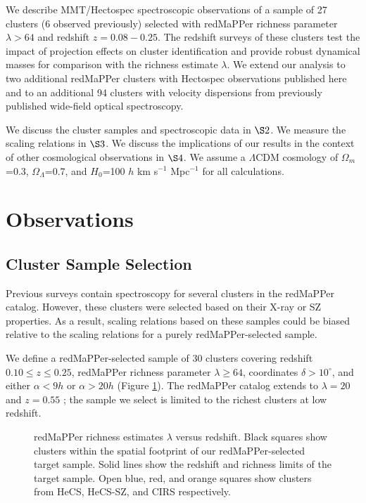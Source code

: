 We describe MMT/Hectospec spectroscopic observations of a sample of 27 clusters 
(6 observed previously) selected with redMaPPer richness parameter $\lambda>64$ and redshift $z=0.08-0.25$. 
The redshift surveys of these clusters test the impact of projection effects
on cluster identification and provide robust dynamical masses for comparison with the richness estimate 
$\lambda$. 
We extend our analysis to two additional redMaPPer clusters with Hectospec observations published here 
and to an additional 94 clusters with velocity dispersions from previously published wide-field optical spectroscopy.   

We discuss the cluster samples and spectroscopic data in $\S 2$.  We measure
the scaling relations in $\S 3$. We discuss
the implications of our results in the context of other cosmological observations
in $\S 4$.  
We assume a $\Lambda$CDM cosmology of
$\Omega_m$=0.3, $\Omega_\Lambda$=0.7, and $H_0$=100 $h$ km s$^{-1}$ Mpc$^{-1}$ for all calculations.



\section{Observations}

\subsection{Cluster Sample Selection}

Previous surveys \citep{cirsi,hecsultimate,hecsplanck} contain spectroscopy for several clusters in the
redMaPPer catalog.  However, these clusters were selected based on their 
X-ray or SZ properties.  As a result, scaling relations based on these samples 
could be biased relative to the scaling relations for a purely redMaPPer-selected 
sample.  

We define a redMaPPer-selected sample of 30 clusters 
covering redshift $0.10\leq z\leq 0.25$, 
redMaPPer richness parameter $\lambda \geq 64$, coordinates $\delta >10^\circ$,
and either $\alpha <9h$ or $\alpha >20h$ (Figure \ref{hecsredzlambda}).  
The redMaPPer catalog extends to $\lambda=20$ and $z=0.55$ \citep{rykoff14}; the sample we select
is limited to the richest clusters at low redshift.  



\begin{figure} 
\caption{\label{hecsredzlambda} redMaPPer richness estimates $\lambda$ versus redshift.  
Black squares show clusters within the spatial footprint of our redMaPPer-selected 
target sample.  Solid lines show the redshift and richness limits of the target sample.
Open blue, red, and orange squares show clusters from HeCS, HeCS-SZ, and CIRS respectively. 
}
\end{figure}


